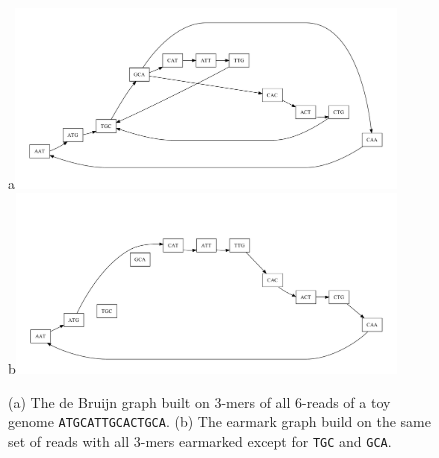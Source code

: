 \documentclass[12pt]{article}
\begin{document}
\begin{figure}
\caption{(a) The de Bruijn graph built on $3$-mers 
of all $6$-reads of a toy genome {\tt ATGCATTGCACTGCA}.
(b) The earmark graph build on the same set of reads with all $3$-mers earmarked except for
{\tt TGC} and {\tt GCA}.}\label{fig:debruijn}
\begin{center}
a\includegraphics[width=0.9\textwidth]{ATGCATTGCACTGCA_debruijn.pdf}\\
b\includegraphics[width=0.9\textwidth]{ATGCATTGCACTGCA_earmark.pdf}\\
\end{center}
\end{figure}

\end{document}
